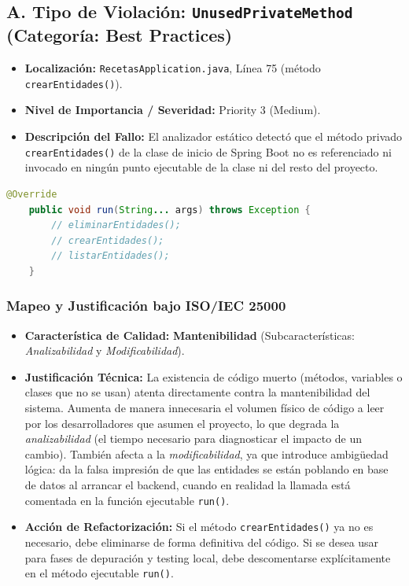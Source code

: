 \documentclass[12pt,a4paper]{article}
\begin{document}
\subsection{A. Tipo de Violación: \texttt{UnusedPrivateMethod} (Categoría: Best Practices)}
\begin{itemize}
    \item \textbf{Localización:} \texttt{RecetasApplication.java}, Línea 75 (método \texttt{crearEntidades()}).
    \item \textbf{Nivel de Importancia / Severidad:} Priority 3 (Medium).
    \item \textbf{Descripción del Fallo:} El analizador estático detectó que el método privado \texttt{crearEntidades()} de la clase de inicio de Spring Boot no es referenciado ni invocado en ningún punto ejecutable de la clase ni del resto del proyecto.
\end{itemize}

\begin{lstlisting}[language=Java, caption={Fragmento de código en RecetasApplication.java con llamadas comentadas}]
	@Override
	public void run(String... args) throws Exception {
		// eliminarEntidades();
		// crearEntidades();
		// listarEntidades();
	}
\end{lstlisting}

\subsubsection{Mapeo y Justificación bajo ISO/IEC 25000}
\begin{itemize}
    \item \textbf{Característica de Calidad:} \textbf{Mantenibilidad} (Subcaracterísticas: \textit{Analizabilidad} y \textit{Modificabilidad}).
    \item \textbf{Justificación Técnica:} La existencia de código muerto (métodos, variables o clases que no se usan) atenta directamente contra la mantenibilidad del sistema. Aumenta de manera innecesaria el volumen físico de código a leer por los desarrolladores que asumen el proyecto, lo que degrada la \textit{analizabilidad} (el tiempo necesario para diagnosticar el impacto de un cambio). También afecta a la \textit{modificabilidad}, ya que introduce ambigüedad lógica: da la falsa impresión de que las entidades se están poblando en base de datos al arrancar el backend, cuando en realidad la llamada está comentada en la función ejecutable \texttt{run()}.
    \item \textbf{Acción de Refactorización:} Si el método \texttt{crearEntidades()} ya no es necesario, debe eliminarse de forma definitiva del código. Si se desea usar para fases de depuración y testing local, debe descomentarse explícitamente en el método ejecutable \texttt{run()}.
\end{itemize}
\end{document}
